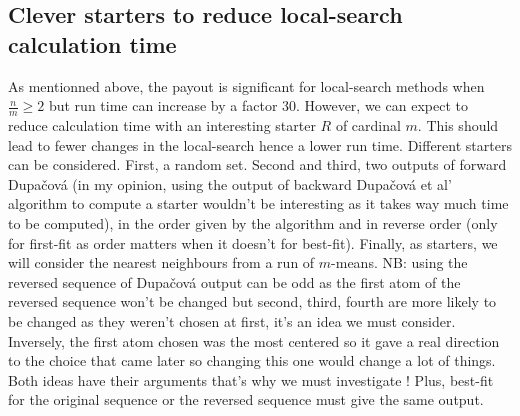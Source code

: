 \documentclass{amsart}
\begin{document}
\subsection{Clever starters to reduce local-search calculation time}
As mentionned above, the payout is significant for local-search methods when $\frac{n}{m}\geq2$ but run time can increase by a factor 30. However, we can expect to reduce calculation time with an interesting starter $R$ of cardinal $m$. This should lead to fewer changes in the local-search hence a lower run time. Different starters can be considered. First, a random set. Second and third, two outputs of forward Dupačová (in my opinion, using the output of backward Dupačová et al' algorithm to compute a starter wouldn't be interesting as it takes way much time to be computed), in the order given by the algorithm and in reverse order (only for first-fit as order matters when it doesn't for best-fit). Finally, as starters, we will consider the nearest neighbours from a run of $m$-means. 
\newline
NB: using the reversed sequence of Dupačová output can be odd as the first atom of the reversed sequence won't be changed but second, third, fourth are more likely to be changed as they weren't chosen at first, it's an idea we must consider. Inversely, the first atom chosen was the most centered so it gave a real direction to the choice that came later so changing this one would change a lot of things. Both ideas have their arguments that's why we must investigate ! Plus, best-fit for the original sequence or the reversed sequence must give the same output.
\end{document}
